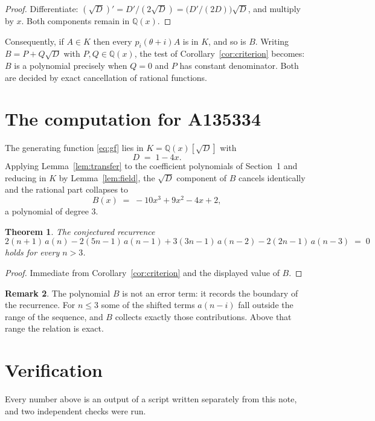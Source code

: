 \documentclass[11pt,a4paper]{article}
\theoremstyle{plain}
\newtheorem{theorem}{Theorem}
\theoremstyle{definition}
\newtheorem{remark}[theorem]{Remark}
\begin{document}
\begin{proof}
Differentiate: $(\sqrt{D})'=D'/(2\sqrt{D})=\bigl(D'/(2D)\bigr)\sqrt{D}$, and multiply by
$x$. Both components remain in $\mathbb{Q}(x)$.
\end{proof}

Consequently, if $A\in K$ then every $p_{i}(\theta+i)A$ is in $K$, and so is $B$. Writing
$B=P+Q\sqrt{D}$ with $P,Q\in\mathbb{Q}(x)$, the test of Corollary~\ref{cor:criterion}
becomes: $B$ is a polynomial precisely when $Q=0$ and $P$ has constant denominator. Both
are decided by exact cancellation of rational functions.

\section{The computation for A135334}

The generating function \eqref{eq:gf} lies in $K=\mathbb{Q}(x)[\sqrt{D}]$ with
\[
D \;=\; 1 - 4 x .
\]
Applying Lemma~\ref{lem:transfer} to the coefficient polynomials of Section~1 and reducing
in $K$ by Lemma~\ref{lem:field}, the $\sqrt{D}$ component of $B$ cancels identically and
the rational part collapses to
\[
B(x)\;=\;- 10 x^{3} + 9 x^{2} - 4 x + 2 ,
\]
a polynomial of degree $3$.

\begin{theorem}
The conjectured recurrence
\[
2 \left(n + 1\right)\,a(n) -  2 \left(5 n - 1\right)\,a(n-1) + 3 \left(3 n - 1\right)\,a(n-2) -  2 \left(2 n - 1\right)\,a(n-3) \;=\;0
\]
holds for every $n>3$.
\end{theorem}

\begin{proof}
Immediate from Corollary~\ref{cor:criterion} and the displayed value of $B$.
\end{proof}

\begin{remark}
The polynomial $B$ is not an error term: it records the boundary of the recurrence. For
$n\le3$ some of the shifted terms $a(n-i)$ fall outside the range of the sequence,
and $B$ collects exactly those contributions. Above that range the relation is exact.
\end{remark}

\section{Verification}

Every number above is an output of a script written separately from this note, and two
independent checks were run.
\end{document}
